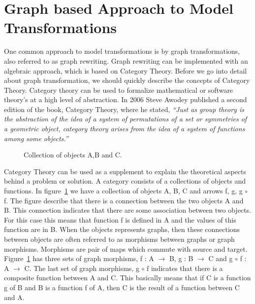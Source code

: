 
\section{Graph based Approach to Model Transformations} 
\label{sec:graph_based}

One common approach to model transformations is by graph transformations,
also referred to as graph rewriting. Graph rewriting can be implemented with
an algebraic approach, which is based on Category Theory. Before we go into
detail about graph transformation, we should quickly describe the concepts of
Category Theory\cite{Herrlich1973,Barr1990}. Category theory can be used to
formalize mathematical or software theory's at a high level of abstraction. In
2006 Steve Awodey published a second edition of the book, Category Theory,
where he stated, \textit{``Just as group theory is the abstraction of the idea
of a system of permutations of a set or symmetries of a geometric object, category
theory arises from the idea of a system of functions among some
objects\cite{Awodey2006}.''} 

\begin{figure}[H]
	\centering
	\caption[Category Theory]
	{Collection of objects A,B and C.}
	\label{fig:categoryTheory}
\end{figure}

Category Theory can be used as a supplement to explain the theoretical aspects
behind a problem or solution. A category consists of a collections of
objects and functions. In figure~\ref{fig:categoryTheory} we have a collection
of objects A, B, C and arrows f, g, g $\circ$ f. The figure describe that
there is a connection between the two objects A and B. This connection
indicates that there are some association between two objects. For this case
this means that function f is defined in A and the values of this function are
in B. When the objects represents graphs, then these connections between objects
are often referred to as morphisms between graphs or graph morphisms. Morphisms
are pair of maps which commute with source and target\cite{Brown2008}.
Figure~\ref{fig:categoryTheory} has three sets of graph morphisms, f : A
$\longrightarrow$ B, g : B $\longrightarrow$ C and g $\circ$ f : A
$\longrightarrow$ C. The last set of graph morphisms, g $\circ$ f indicates that
there is a composite function between A and C. This basically means that if
C is a function g of B and B is a function f of A, then C is the result of a
function between C and A. 

